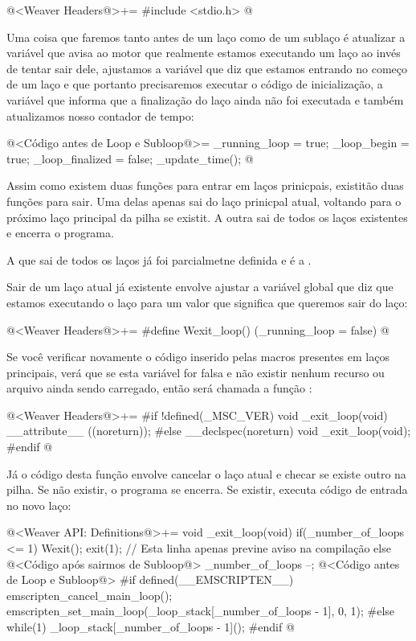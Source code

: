 @<Weaver Headers@>+=
#include <stdio.h>
@

Uma coisa que faremos tanto antes de um laço como de um sublaço é
atualizar a variável  que avisa ao motor
que realmente estamos executando um laço ao invés de tentar sair dele,
ajustamos a variável que diz que estamos entrando no começo de um laço
e que portanto precisaremos executar o código de inicialização, a
variável que informa que a finalização do laço ainda não foi executada
e também atualizamos nosso contador de tempo:

\iniciocodigo
@<Código antes de Loop e Subloop@>=
_running_loop = true;
_loop_begin = true;
_loop_finalized = false;
_update_time();
@
\fimcodigo


Assim como existem duas funções para entrar em laços prinicpais,
existitão duas funções para sair. Uma delas apenas sai do laço
prinicpal atual, voltando para o próximo laço principal da pilha se
existit. A outra sai de todos os laços existentes e encerra o
programa.

A que sai de todos os laços já foi parcialmetne definida e é
a .

Sair de um laço atual já existente envolve ajustar a variável global
que diz que estamos executando o laço para um valor que significa que
queremos sair do laço:

\iniciocodigo
@<Weaver Headers@>+=
#define Wexit_loop() (_running_loop = false)
@
\fimcodigo

Se você verificar novamente o código inserido pelas macros presentes
em laços principais, verá que se esta variável for falsa e não existir
nenhum recurso ou arquivo ainda sendo carregado, então será chamada a
função :

\iniciocodigo
@<Weaver Headers@>+=
#if !defined(_MSC_VER)
void _exit_loop(void) __attribute__ ((noreturn));
#else
__declspec(noreturn) void _exit_loop(void);
#endif
@
\fimcodigo

Já o código desta função envolve cancelar o laço atual e checar se
existe outro na pilha. Se não existir, o programa se encerra. Se
existir, executa código de entrada no novo laço:

\iniciocodigo
@<Weaver API: Definitions@>+=
void _exit_loop(void){
  if(_number_of_loops <= 1){
    Wexit();
    exit(1); // Esta linha apenas previne aviso na compilação
  }
  else{
    @<Código após sairmos de Subloop@>
    _number_of_loops --;
    @<Código antes de Loop e Subloop@>
#if defined(__EMSCRIPTEN__)
    emscripten_cancel_main_loop();
    emscripten_set_main_loop(_loop_stack[_number_of_loops - 1], 0, 1);
#else
    while(1)
      _loop_stack[_number_of_loops - 1]();
#endif
  }
}
@
\fimcodigo

